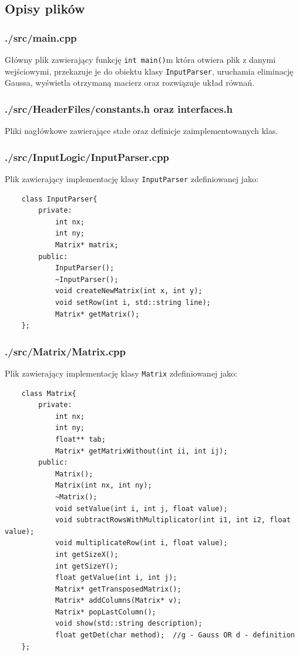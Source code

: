 \documentclass{article}
\begin{document}
\subsection{Opisy plików}

\subsubsection{./src/main.cpp}

Główny plik zawierający funkcję \texttt{int main()}m która otwiera plik z danymi wejściowymi, przekazuje je do obiektu klasy \texttt{InputParser}, uruchamia eliminację Gaussa, wyświetla otrzymaną macierz oraz rozwiązuje układ równań.

\subsubsection{./src/HeaderFiles/constants.h oraz interfaces.h}

Pliki nagłówkowe zawierające stałe oraz definicje zaimplementowanych klas.

\subsubsection{./src/InputLogic/InputParser.cpp}

Plik zawierający implementację klasy \texttt{InputParser} zdefiniowanej jako:

\begin{verbatim}
    class InputParser{
        private:
            int nx;
            int ny;
            Matrix* matrix;
        public:
            InputParser();
            ~InputParser();
            void createNewMatrix(int x, int y);
            void setRow(int i, std::string line);
            Matrix* getMatrix();
    };
\end{verbatim}

\subsubsection{./src/Matrix/Matrix.cpp}

Plik zawierający implementację klasy \texttt{Matrix} zdefiniowanej jako:

\begin{verbatim}
    class Matrix{
        private:
            int nx;
            int ny;
            float** tab;
            Matrix* getMatrixWithout(int ii, int ij);
        public:
            Matrix();
            Matrix(int nx, int ny);
            ~Matrix();
            void setValue(int i, int j, float value);
            void subtractRowsWithMultiplicator(int i1, int i2, float value);
            void multiplicateRow(int i, float value);
            int getSizeX();
            int getSizeY();
            float getValue(int i, int j);
            Matrix* getTransposedMatrix();
            Matrix* addColumns(Matrix* v);
            Matrix* popLastColumn();
            void show(std::string description);
            float getDet(char method);  //g - Gauss OR d - definition
    };
\end{verbatim}
\end{document}
